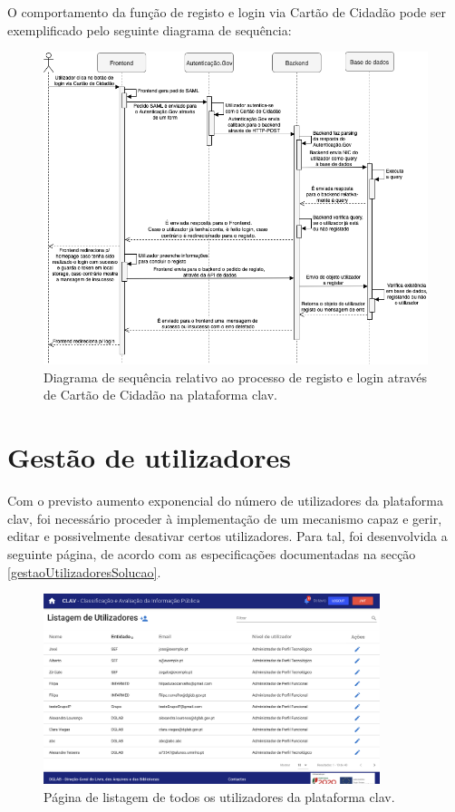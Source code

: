 O comportamento da função de registo e login via Cartão de Cidadão pode ser exemplificado pelo seguinte diagrama de sequência:

\vspace{5mm}
\begin{figure}[H]
    \centering
    \includegraphics[width=\textwidth]{img/diagramas/sequencia/DiagramasSequencia-LoginCC.png}
    \caption{Diagrama de sequência relativo ao processo de registo e login através de Cartão de Cidadão na plataforma \gls{clav}.}
    \label{fig:diagramaSequenciaCC}
\end{figure}

\cleardoublepage
\section{Gestão de utilizadores}
\vspace{-3mm}
Com o previsto aumento exponencial do número de utilizadores da plataforma \gls{clav}, foi necessário proceder à implementação de um mecanismo capaz e gerir, editar e possivelmente desativar certos utilizadores. Para tal, foi desenvolvida a seguinte página, de acordo com as especificações documentadas na secção \ref{gestaoUtilizadoresSolucao}.
\vspace{-3mm}
\begin{figure}[H]
    \centering
    \includegraphics[width=0.875\textwidth]{img/clav/gestao/listagem.png}
    \caption{Página de listagem de todos os utilizadores da plataforma \gls{clav}.}
    \label{fig:pagListagemUtilizadores}
\end{figure}

